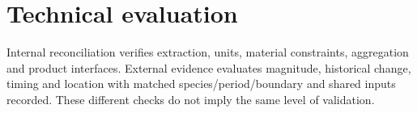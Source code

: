 \section{Technical evaluation}\label{sec:validation}
Internal reconciliation verifies extraction, units, material constraints, aggregation and product interfaces. External evidence evaluates magnitude, historical change, timing and location with matched species/period/boundary and shared inputs recorded. These different checks do not imply the same level of validation.
\pkinvLeadFragment

\pkinvEndFragment
\pkinvDemoteFragment

\pkinvEndFragment

